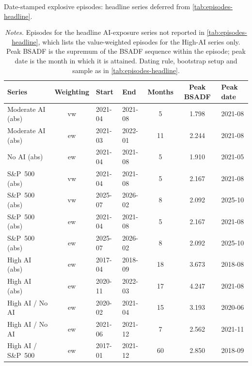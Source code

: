 \begin{table}[!htbp]
\centering
\caption{Date-stamped explosive episodes: headline series deferred from \cref{tab:episodes-headline}.}
\label{tab:episodes-headline-deferred}
\small
\begin{tabular}{l c l l S[table-format=2.0] S[table-format=1.3] l}
\toprule
Series & Weighting & Start & End & {Months} & {Peak BSADF} & Peak date \\
\midrule
Moderate AI (abs)     & vw & 2021-04 & 2021-08 &  5 & 1.798 & 2021-08 \\
Moderate AI (abs)     & ew & 2021-03 & 2022-01 & 11 & 2.244 & 2021-08 \\
\midrule
No AI (abs)           & ew & 2021-04 & 2021-08 &  5 & 1.910 & 2021-05 \\
\midrule
S\&P~500 (abs)        & vw & 2021-04 & 2021-08 &  5 & 2.167 & 2021-08 \\
S\&P~500 (abs)        & vw & 2025-07 & 2026-02 &  8 & 2.092 & 2025-10 \\
S\&P~500 (abs)        & ew & 2021-04 & 2021-08 &  5 & 2.167 & 2021-08 \\
S\&P~500 (abs)        & ew & 2025-07 & 2026-02 &  8 & 2.092 & 2025-10 \\
\midrule
High AI (abs)         & ew & 2017-04 & 2018-09 & 18 & 3.673 & 2018-08 \\
High AI (abs)         & ew & 2020-11 & 2022-03 & 17 & 4.247 & 2021-08 \\
\midrule
High AI / No AI       & ew & 2020-02 & 2021-04 & 15 & 3.193 & 2020-06 \\
High AI / No AI       & ew & 2021-06 & 2021-12 &  7 & 2.562 & 2021-11 \\
\midrule
High AI / S\&P~500    & ew & 2017-01 & 2021-12 & 60 & 2.850 & 2018-09 \\
\bottomrule
\end{tabular}
\caption*{\footnotesize \textit{Notes.} Episodes for the headline AI-exposure series not reported in \cref{tab:episodes-headline}, which lists the value-weighted episodes for the High-AI series only. Peak BSADF is the supremum of the BSADF sequence within the episode; peak date is the month in which it is attained. Dating rule, bootstrap setup and sample as in \cref{tab:episodes-headline}.}
\end{table}
 
